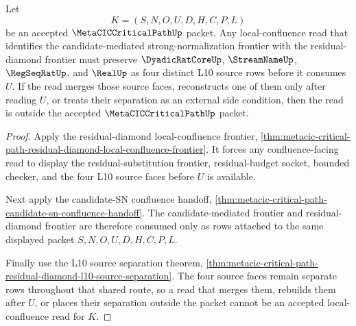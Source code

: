 \begin{theorem}
\label{thm:metacic-critical-path-residual-diamond-source-determinacy}
Let
$$
K=(S,N,O,U,D,H,C,P,L)
$$
be an accepted $\MetaCICCriticalPathUp$ packet. Any local-confluence read that identifies the candidate-mediated strong-normalization frontier with the residual-diamond frontier must preserve $\DyadicRatCoreUp$, $\StreamNameUp$, $\RegSeqRatUp$, and $\RealUp$ as four distinct L10 source rows before it consumes $U$. If the read merges those source faces, reconstructs one of them only after reading $U$, or treats their separation as an external side condition, then the read is outside the accepted $\MetaCICCriticalPathUp$ packet.
\end{theorem}
\begin{proof}
Apply the residual-diamond local-confluence frontier, \autoref{thm:metacic-critical-path-residual-diamond-local-confluence-frontier}. It forces any confluence-facing read to display the residual-substitution frontier, residual-budget socket, bounded checker, and the four L10 source faces before $U$ is available.

Next apply the candidate-SN confluence handoff, \autoref{thm:metacic-critical-path-candidate-sn-confluence-handoff}. The candidate-mediated frontier and residual-diamond frontier are therefore consumed only as rows attached to the same displayed packet $S,N,O,U,D,H,C,P,L$.

Finally use the L10 source separation theorem, \autoref{thm:metacic-critical-path-residual-diamond-l10-source-separation}. The four source faces remain separate rows throughout that shared route, so a read that merges them, rebuilds them after $U$, or places their separation outside the packet cannot be an accepted local-confluence read for $K$.
\end{proof}


